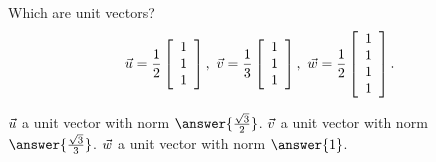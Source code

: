 \documentclass{ximera}
\author{Zack Reed}
\begin{document}
\begin{exercise}

Which are unit vectors?
\begin{equation*}
  \vect{u}=\frac{1}{2}\startmat{c}1\\1\\1\stopmat, \quad
  \vect{v}=\frac{1}{3}\startmat{c}1\\1\\1\stopmat, \quad
  \vect{w}=\frac{1}{2}\startmat{c}1\\1\\1\\1\stopmat.
\end{equation*}

$\vect{u}$  a unit vector with norm $\answer{\frac{\sqrt{3}}{2}}$. $\vect{v}$  a unit vector with norm $\answer{\frac{\sqrt{3}}{3}}$. $\vect{w}$  a unit vector with norm $\answer{1}$.

\end{exercise}
\end{document}
